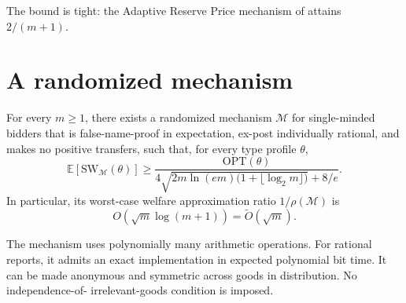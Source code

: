 \documentclass[format=acmsmall, review=false]{acmart}
\newcommand{\E}{\mathbb{E}}
\newcommand{\OPT}{\mathrm{OPT}}
\newcommand{\SW}{\mathrm{SW}}
\begin{document}
The bound is tight: the Adaptive Reserve Price mechanism of
\cite{iwasaki2010worst} attains $2/(m+1)$.

\section{A randomized mechanism}
\label{sec:randomized}

\begin{theorem}\label{thm:main}
For every \(m\ge1\), there exists a randomized mechanism
\(\mathcal M\) for single-minded bidders that is
false-name-proof in expectation, ex-post individually rational,
and makes no positive transfers, such that, for every type
profile \(\theta\),
\[
\E[\SW_{\mathcal M}(\theta)]
\ge
\frac{\OPT(\theta)}{
4\sqrt{2m\ln(em)\bigl(1+\lfloor\log_2m\rfloor\bigr)}+8/e}.
\]
In particular, its worst-case welfare approximation ratio
\(1/\rho(\mathcal M)\) is
\[
O(\sqrt m\log(m+1))=\widetilde O(\sqrt m).
\]

The mechanism uses polynomially many arithmetic operations.
For rational reports, it admits an exact implementation in
expected polynomial bit time. It can be made anonymous and
symmetric across goods in distribution. No independence-of-
irrelevant-goods condition is imposed.
\end{theorem}
\end{document}
